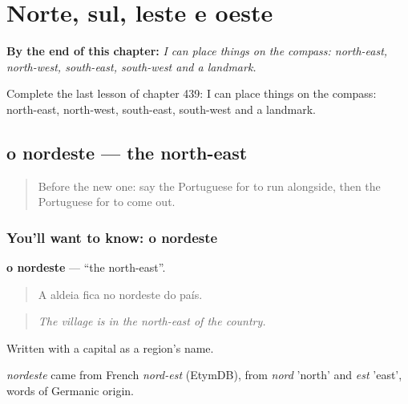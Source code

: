 
\chapter{Norte, sul, leste e oeste}
\label{ch:pt-norte-sul-leste-e-oeste}

\begin{chapteropening}
\textbf{By the end of this chapter:} \emph{I can place things on the compass: north-east, north-west, south-east, south-west and a landmark.}

Complete the last lesson of chapter 439: I can place things on the compass: north-east, north-west, south-east, south-west and a landmark.
\end{chapteropening}

\section[o nordeste]{o nordeste — the north-east}

\label{lesson:PT-C439-nordeste}



\begin{quote}
Before the new one: say the Portuguese for to run alongside, then the Portuguese for to come out.
\end{quote}

\subsection*{You'll want to know: o nordeste}
\textbf{o nordeste} — \textquotedblleft{}the north-east\textquotedblright{}.

\begin{quote}
A aldeia fica no nordeste do país.
\end{quote}

\begin{quote}
\emph{The village is in the north-east of the country.}
\end{quote}

Written with a capital as a region's name.

\begin{cousinweb}
\emph{nordeste} came from French \emph{nord-est} (EtymDB), from \emph{nord} 'north' and \emph{est} 'east', words of Germanic origin.
\end{cousinweb}

